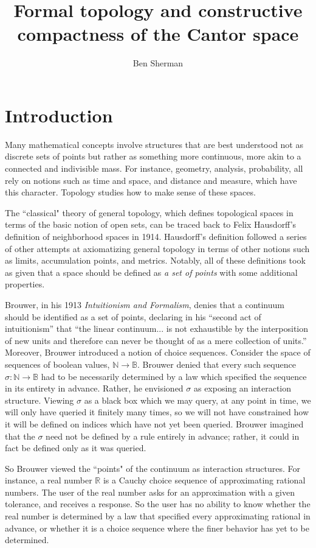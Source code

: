 \documentclass{article}           %
\title{Formal topology and constructive compactness of the Cantor space}
\author{Ben Sherman}
\newcommand{\nat}{\mathbb{N}}
\newcommand{\bool}{\mathbb{B}}
\begin{document}
\maketitle

\section{Introduction}

Many mathematical concepts involve structures that are best understood not as discrete sets of points but rather as something more continuous, more akin to a connected and indivisible mass. For instance, geometry, analysis, probability, all rely on notions such as time and space, and distance and measure, which have this character. Topology studies how to make sense of these spaces.

The ``classical" theory of general topology, which defines topological spaces in terms of the basic notion of open sets, can be traced back to Felix Hausdorff's definition of neighborhood spaces in 1914. Hausdorff's definition followed a series of other attempts at axiomatizing general topology in terms of other notions such as limits, accumulation points, and metrics. Notably, all of these definitions took as given that a space should be defined as \emph{a set of points} with some additional properties.

Brouwer, in his 1913 \emph{Intuitionism and Formalism}, denies that a continuum should be identified as a set of points, declaring in his ``second act of intuitionism'' that ``the linear continuum... is not exhaustible by the interposition of new units and therefore can never be thought of as a mere collection of units.'' Moreover, Brouwer introduced a notion of choice sequences. Consider the space of sequences of boolean values, $\nat \to \bool$. Brouwer denied that every such sequence $\sigma : \nat \to \bool$ had to be necessarily determined by a law which specified the sequence in its entirety in advance. Rather, he envisioned $\sigma$ as exposing an interaction structure. Viewing $\sigma$ as a black box which we may query, at any point in time, we will only have queried it finitely many times, so we will not have constrained how it will be defined on indices which have not yet been queried. Brouwer imagined that the $\sigma$ need not be defined by a rule entirely in advance; rather, it could in fact be defined only as it was queried.

So Brouwer viewed the ``points" of the continuum as interaction structures. For instance, a real number $\mathbb{R}$ is a Cauchy choice sequence of approximating rational numbers. The user of the real number asks for an approximation with a given tolerance, and receives a response. So the user has no ability to know whether the real number is determined by a law that specified every approximating rational in advance, or whether it is a choice sequence where the finer behavior has yet to be determined.
\end{document}
